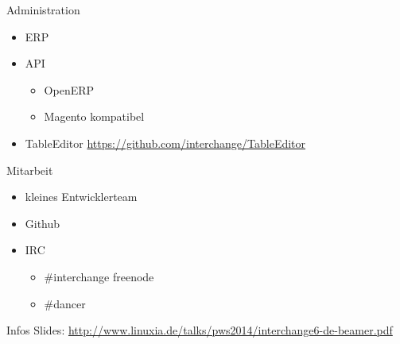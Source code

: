 \begin{frame}{Administration}
\begin{itemize}
\item ERP
\item API
\begin{itemize}
\item OpenERP
\item Magento kompatibel
\end{itemize}
\item TableEditor
\url{https://github.com/interchange/TableEditor}
\end{itemize}
\end{frame}

\begin{frame}{Mitarbeit}
\begin{itemize}
\item kleines Entwicklerteam
\item Github
\item IRC 
\begin{itemize}
\item \#interchange freenode
\item \#dancer
\end{itemize}
\end{itemize}
\end{frame}

\begin{frame}{Infos}
Slides:
\url{http://www.linuxia.de/talks/pws2014/interchange6-de-beamer.pdf}
\end{frame}



